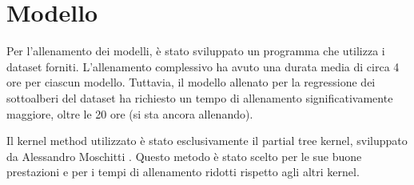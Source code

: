 \section{Modello}

Per l'allenamento dei modelli, è stato sviluppato un programma che utilizza i 
dataset forniti. L'allenamento complessivo ha avuto una durata media di circa 
4 ore per ciascun modello. Tuttavia, il modello allenato per la regressione 
dei sottoalberi del dataset ha richiesto un tempo di allenamento 
significativamente maggiore, oltre le 20 ore (si sta ancora allenando).

Il kernel method utilizzato è stato esclusivamente il partial tree 
kernel, sviluppato da Alessandro Moschitti \cite{kernel}. Questo metodo è 
stato scelto per le sue buone prestazioni e per i tempi di allenamento ridotti 
rispetto agli altri kernel.
